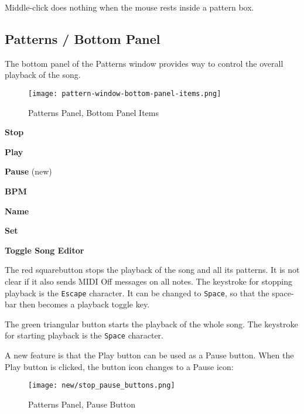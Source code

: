    Middle-click does nothing when the mouse rests inside a pattern box.

\subsection{Patterns / Bottom Panel}
\label{subsec:seq64_patterns_panel_bottom}

   The bottom panel of the Patterns window provides way to control the
   overall playback of the song.

\begin{figure}[H]
   \centering 
   \texttt{[image: pattern-window-bottom-panel-items.png]}
   \caption{Patterns Panel, Bottom Panel Items}
   \label{fig:pattern_window_bottom_panel_items}
\end{figure}

   \begin{enumber}
      \item \textbf{Stop}
      \item \textbf{Play}
      \item \textbf{Pause} (new)
      \item \textbf{BPM}
      \item \textbf{Name}
      \item \textbf{Set}
      \item \textbf{Toggle Song Editor}
   \end{enumber}

   \setcounter{ItemCounter}{0}      %

   The red squarebutton stops the playback of the song and all its patterns.
   It is not clear if it also sends MIDI Off messages on all notes.
   The keystroke for stopping playback is the \texttt{Escape} character.
   It can be changed to \texttt{Space}, so that the space-bar then becomes a
   playback toggle key.

   The green triangular button starts the playback of the whole song.
   The keystroke for starting playback is the \texttt{Space} character.

   A new feature is that the Play button can be used as a Pause button.
   When the Play button is clicked, the button icon changes to a Pause icon:

\begin{figure}[H]
   \centering 
   \texttt{[image: new/stop\_pause\_buttons.png]}
   \caption{Patterns Panel, Pause Button}
   \label{fig:pattern_window_pause_button}
\end{figure}

